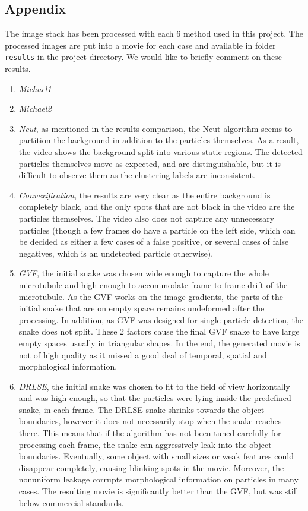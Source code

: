 \documentclass{article}
\begin{document}
\clearpage
\subsection*{Appendix}

The image stack has been processed with each 6 method used in this project. The processed images are put into a movie for each case and available in folder \texttt{results} in the project directory. We would like to briefly comment on these results.

\begin{enumerate}
\item \em Michael1
\item \em Michael2
\item \emph{Ncut}, as mentioned in the results comparison, the Ncut algorithm seems to partition the background in addition to the particles themselves. As a result, the video shows the background split into various static regions. The detected particles themselves move as expected, and are distinguishable, but it is difficult to observe them as the clustering labels are inconsistent.
\item \emph{Convexification}, the results are very clear as the entire background is completely black, and the only spots that are not black in the video are the particles themselves. The video also does not capture any unnecessary particles (though a few frames do have a particle on the left side, which can be decided as either a few cases of a false positive, or several cases of false negatives, which is an undetected particle otherwise).

\item \emph{GVF}, the initial snake was chosen wide enough to capture the whole microtubule and high enough to accommodate frame to frame drift of the microtubule. As the GVF works on the image gradients, the parts of the initial snake that are on empty space remains undeformed after the processing. In addition, as GVF was designed for single particle detection, the snake does not split. These 2 factors cause the final GVF snake to have large empty spaces usually in triangular shapes. In the end, the generated movie is not of high quality as it missed a good deal of temporal, spatial and morphological information.

\item \emph{DRLSE}, the initial snake was chosen to fit to the field of view horizontally and was high enough, so that the particles were lying inside the predefined snake, in each frame. The DRLSE snake shrinks towards the object boundaries, however it does not necessarily stop when the snake reaches there. This means that if the algorithm has not been tuned carefully for processing each frame, the snake can aggressively leak into the object boundaries. Eventually, some object with small sizes or weak features could disappear completely, causing blinking spots in the movie. Moreover, the nonuniform leakage corrupts morphological information on particles in many cases. The resulting movie is significantly better than the GVF, but was still below commercial standards.


\end {enumerate}
\end{document}
